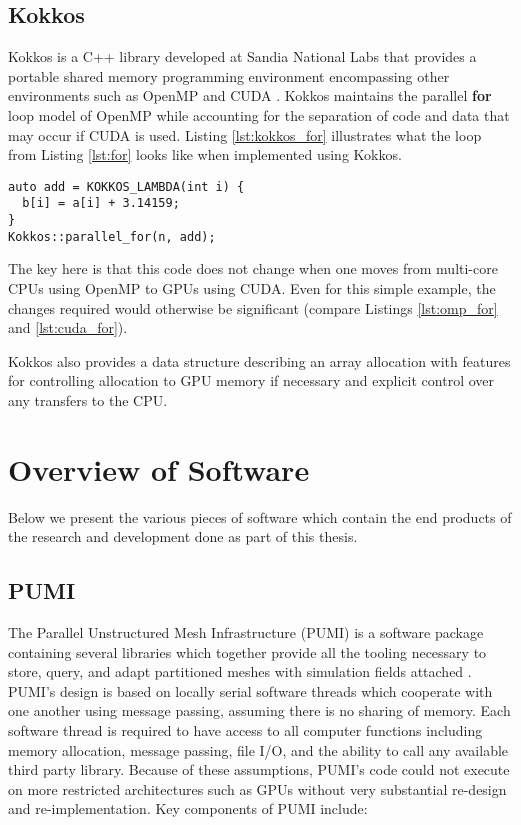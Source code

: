 \subsection{Kokkos}
\label{sec:kokkos}

Kokkos is a C++ library developed at Sandia National Labs that provides
a portable shared memory programming environment encompassing other
environments such as OpenMP and CUDA \cite{edwards2013kokkos}.
Kokkos maintains the parallel {\bf for} loop model of OpenMP while
accounting for the separation of code and data that may occur if CUDA is used.
Listing \ref{lst:kokkos_for} illustrates what the loop from Listing
\ref{lst:for} looks like when implemented using Kokkos.

\begin{lstlisting}[float,style=dan-style,caption=Kokkos {\bf for} loop,label=lst:kokkos_for]
auto add = KOKKOS_LAMBDA(int i) {
  b[i] = a[i] + 3.14159;
}
Kokkos::parallel_for(n, add);
\end{lstlisting}

The key here is that this code does not change when one moves
from multi-core CPUs using OpenMP to GPUs using CUDA.
Even for this simple example, the changes required would otherwise
be significant (compare Listings \ref{lst:omp_for} and \ref{lst:cuda_for}).

Kokkos also provides a data structure describing an array allocation
with features for controlling allocation to GPU memory if necessary
and explicit control over any transfers to the CPU.

\section{Overview of Software}

Below we present the various pieces of software which contain
the end products of the research and development done as
part of this thesis.

\subsection{PUMI}

The Parallel Unstructured Mesh Infrastructure (PUMI) is a software package
containing several libraries which together provide all the tooling
necessary to store, query, and adapt partitioned meshes with
simulation fields attached \cite{pumi_github}.
PUMI's design is based on locally serial software threads which
cooperate with one another using message passing, assuming
there is no sharing of memory.
Each software thread is required to have access to all computer
functions including memory allocation, message passing, file I/O, and the ability
to call any available third party library.
Because of these assumptions, PUMI's code could not execute
on more restricted architectures such as GPUs without very
substantial re-design and re-implementation.
Key components of PUMI include:

